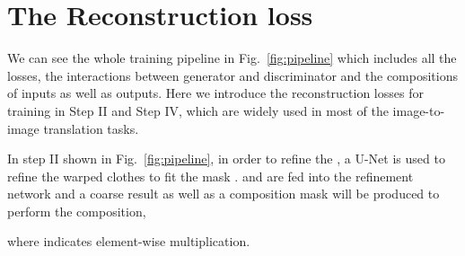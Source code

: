 \documentclass[10pt,twocolumn,letterpaper]{article}
\begin{document}
{\small


}

\clearpage{}





\begin{figure}[htb]

\end{figure}
\vspace{-20pt}

\thispagestyle{empty}

\section{The Reconstruction loss}
We can see the whole training pipeline in Fig.~\ref{fig:pipeline} which includes all the losses, the interactions between generator and discriminator and the compositions of inputs as well as outputs. Here we introduce the reconstruction losses for training in Step II and Step IV, which are widely used in most of the image-to-image translation tasks.

In step II shown in Fig.~\ref{fig:pipeline}, in order to refine the , a U-Net is used to refine the warped clothes to fit the mask .  and  are fed into the refinement network and a coarse result as well as a composition mask  will be produced to perform the composition,

where  indicates element-wise multiplication.
\end{document}
